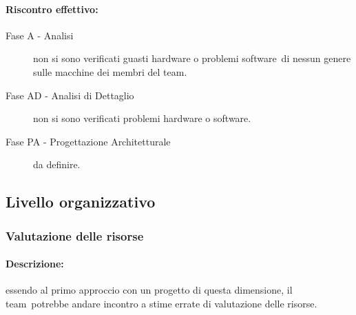 \documentclass[../PianoProgetto.tex]{subfiles}
\begin{document}
	\paragraph*{Riscontro effettivo:}
		\begin{description}
			\item[Fase A - Analisi] non si sono verificati guasti hardware o problemi software\g\ di nessun genere sulle macchine dei membri del team\g .
			\item[Fase AD - Analisi di Dettaglio] non si sono verificati problemi hardware o software\g.
			\item[Fase PA - Progettazione Architetturale] da definire.
		\end{description}

\newpage
\subsection{Livello organizzativo}

\subsubsection{Valutazione delle risorse}
\label{sec:Valutazione delle risorse}

	\paragraph*{Descrizione:} essendo al primo approccio con un progetto di questa dimensione, il team\g\ potrebbe andare incontro a stime errate di valutazione delle risorse.
	
	
\end{document}
